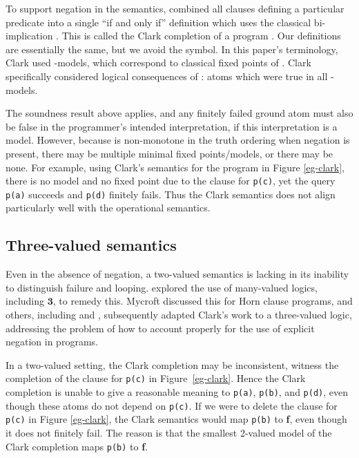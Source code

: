 \documentclass{tlp}
\newcommand{\Tri}{\ensuremath{\mathbf{3}}}
\begin{document}
To support negation in the semantics,  combined all
clauses defining a particular predicate into a single ``if and only if''
definition which uses the classical bi-implication .
This is called the Clark completion  of a program .  
Our definitions
are essentially the same, but we avoid the  symbol.
In this paper's terminology,
Clark used -models, which correspond to classical fixed points 
of .  Clark specifically considered logical consequences
of : atoms which were true in all -models.

The soundness result above applies, and any finitely failed ground atom
must also be false in the programmer's intended interpretation, if 
this interpretation is a model.  
However, because  is non-monotone in the
truth ordering when negation is present, there may be multiple minimal
fixed points/models, or there may be none.  For example, using Clark's
semantics for the program in Figure \ref{eg-clark}, there is no model
and no fixed point due to the clause for \texttt{p(c)}, yet the query
\texttt{p(a)} succeeds and \texttt{p(d)} finitely fails.  Thus the Clark
semantics does not align particularly well with the operational semantics.


\subsection{Three-valued semantics}
\label{sec-fitting-kunen}

Even in the absence of negation, a two-valued semantics is lacking in
its inability to distinguish failure and looping.
 explored the use of many-valued logics,
including \Tri, to remedy this.
Mycroft discussed this for Horn clause programs, and
others, including  and ,
subsequently adapted Clark's work to a three-valued logic, 
addressing the problem of how to account properly for the use of
explicit negation in programs.

In a two-valued setting, the Clark completion may be inconsistent,
witness the completion of the clause for \verb!p(c)! in
Figure~\ref{eg-clark}.
Hence the Clark completion is unable to give a reasonable meaning to
\texttt{p(a)}, \texttt{p(b)}, and \texttt{p(d)}, even though these atoms
do not depend on \texttt{p(c)}.
If we were to delete the clause for \texttt{p(c)} in Figure
\ref{eg-clark}, the Clark semantics would map \texttt{p(b)} to \textbf{f},
even though it does not finitely fail.   
The reason is that the smallest 2-valued model of the Clark completion
 maps \texttt{p(b)} to
\textbf{f}.
\end{document}
